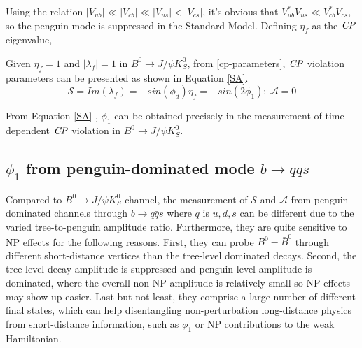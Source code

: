 Using the relation $|V_{ub}|\ll |V_{cb}|\ll|V_{us}|<|V_{cs}|$, it's obvious that $V^*_{ub}V_{us} \ll V^*_{cb}V_{cs}$, so the penguin-mode is suppressed in the Standard Model. Defining $\eta_f$ as the $\it{CP}$ eigenvalue, 


Given $\eta_f=1$ and $|\lambda_f|=1$ in $B^0 \to J/\psi K^0_S$, from \ref{cp-parameters}, $\it{CP}$ violation parameters can be presented as shown in Equation \ref{SA}.
\begin{equation}\label{SA}
\mathcal{S} = Im(\lambda_f)
=-sin(\phi_d)\eta_f=-sin(2\phi_1) ; \: \mathcal{A} = 0
\end{equation}

From Equation \ref{SA} , $\phi_1$ can be obtained precisely in the measurement of time-dependent $\it{CP}$ violation in $B^0 \to J/\psi K^0_S$.
\begin{comment}
In the $b\to q\bar{q}s$ process where flavor $q$ is not charm, similar to the discussion above, we can extract $\phi_1$ using the same method. Moreover, it provides a penguin-dominated process which is sensitive to the contribution of New Physics, which includes the $B^0_d\to K^0_S K^0_S K^0_S$ decay. In the next section, it's clear that such decay process is important to provide additional insight in seeking the effect beyond the SM (BSM contribution).
\end{comment}



\subsection{$\phi_1$ from penguin-dominated mode $b\to q\bar{q}s$}
Compared to $B^0 \to J/\psi K^0_S$ channel, the measurement of $\mathcal{S}$ and $\mathcal{A}$ from penguin-dominated channels through $b \to q\bar{q}s$ where $q$ is $u,d,s$ can be different due to the varied tree-to-penguin amplitude ratio. Furthermore, they are quite sensitive to NP effects for the following reasons\cite{b2book}. First, they can probe $B^0-\bar{B}^0$ through different short-distance vertices than the tree-level dominated decays. Second, the tree-level decay amplitude is suppressed and penguin-level amplitude is dominated, where the overall non-NP amplitude is relatively small so NP effects may show up easier. Last but not least, they comprise a large number of different final states, which can help disentangling non-perturbation long-distance physics from short-distance information, such as $\phi_1$ or NP contributions to the weak Hamiltonian. 

